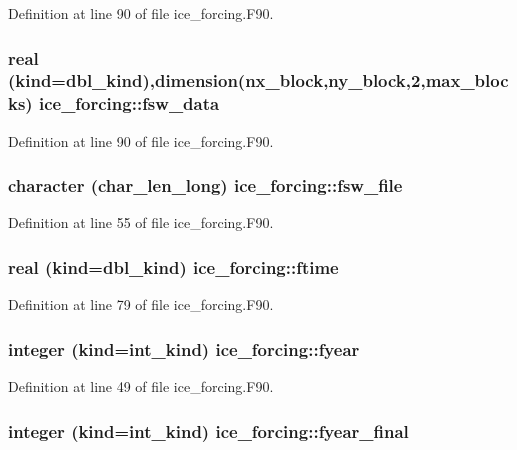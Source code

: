 Definition at line 90 of file ice\_\-forcing.F90.\hypertarget{namespaceice__forcing_a423a50a8e4373aae7be0c11fe1ab7e0f}{
\subsubsection[{fsw\_\-data}]{\setlength{\rightskip}{0pt plus 5cm}real (kind=dbl\_\-kind),dimension(nx\_\-block,ny\_\-block,2,max\_\-blocks) {\bf ice\_\-forcing::fsw\_\-data}}}
\label{namespaceice__forcing_a423a50a8e4373aae7be0c11fe1ab7e0f}


Definition at line 90 of file ice\_\-forcing.F90.\hypertarget{namespaceice__forcing_ad4465d0f13c0141d16998d7771003a45}{
\subsubsection[{fsw\_\-file}]{\setlength{\rightskip}{0pt plus 5cm}character (char\_\-len\_\-long) {\bf ice\_\-forcing::fsw\_\-file}}}
\label{namespaceice__forcing_ad4465d0f13c0141d16998d7771003a45}


Definition at line 55 of file ice\_\-forcing.F90.\hypertarget{namespaceice__forcing_a7818997d422d32d4d238d866a60e50a7}{
\subsubsection[{ftime}]{\setlength{\rightskip}{0pt plus 5cm}real (kind=dbl\_\-kind) {\bf ice\_\-forcing::ftime}}}
\label{namespaceice__forcing_a7818997d422d32d4d238d866a60e50a7}


Definition at line 79 of file ice\_\-forcing.F90.\hypertarget{namespaceice__forcing_a9e840876f677642389293c4dda357eef}{
\subsubsection[{fyear}]{\setlength{\rightskip}{0pt plus 5cm}integer (kind=int\_\-kind) {\bf ice\_\-forcing::fyear}}}
\label{namespaceice__forcing_a9e840876f677642389293c4dda357eef}


Definition at line 49 of file ice\_\-forcing.F90.\hypertarget{namespaceice__forcing_aebf7ee5db66f4a38134d1314a4de3f8f}{
\subsubsection[{fyear\_\-final}]{\setlength{\rightskip}{0pt plus 5cm}integer (kind=int\_\-kind) {\bf ice\_\-forcing::fyear\_\-final}}}
\label{namespaceice__forcing_aebf7ee5db66f4a38134d1314a4de3f8f}


